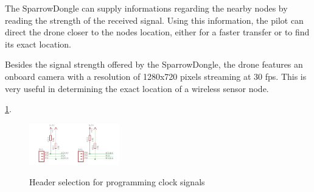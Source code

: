 \label{sec:prox}

The SparrowDongle can supply informations regarding the nearby nodes by reading the strength of the received signal. Using this information, the pilot can direct the drone closer to the nodes location, either for a faster transfer or to find its exact location. 

Besides the signal strength offered by the SparrowDongle, the drone features an onboard camera with a resolution of 1280x720 pixels streaming at 30 fps. This is very useful in determining the exact location of a wireless sensor node.


\ref{fig:progr}.


\begin{figure}[ht] \centering \label{fig:progr}
\includegraphics[width=0.35\textwidth]{img/progr.png} \caption{Header selection
for programming clock signals} \end{figure}



